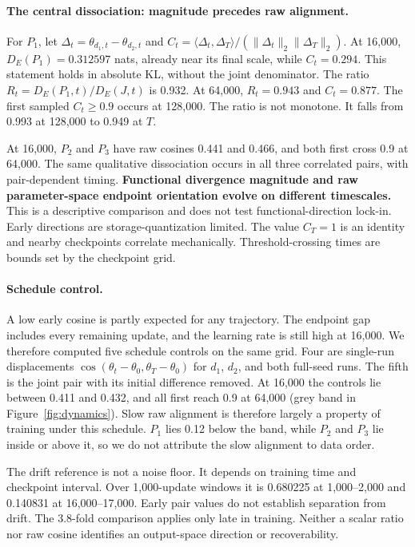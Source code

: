 \documentclass{article}
\begin{document}
\paragraph{The central dissociation: magnitude precedes raw alignment.}
For $P_1$, let $\Delta_t=\theta_{d_1,t}-\theta_{d_2,t}$ and $C_t=\langle\Delta_t,\Delta_T\rangle/(\|\Delta_t\|_2\|\Delta_T\|_2)$. At 16,000, $D_E(P_1)=0.312597$ nats, already near its final scale, while $C_t=0.294$. This statement holds in absolute KL, without the joint denominator. The ratio $R_t=D_E(P_1,t)/D_E(J,t)$ is 0.932. At 64,000, $R_t=0.943$ and $C_t=0.877$. The first sampled $C_t\geq0.9$ occurs at 128,000. The ratio is not monotone. It falls from 0.993 at 128,000 to 0.949 at $T$.

At 16,000, $P_2$ and $P_3$ have raw cosines 0.441 and 0.466, and both first cross 0.9 at 64,000. The same qualitative dissociation occurs in all three correlated pairs, with pair-dependent timing. \textbf{Functional divergence magnitude and raw parameter-space endpoint orientation evolve on different timescales.} This is a descriptive comparison and does not test functional-direction lock-in. Early directions are storage-quantization limited. The value $C_T=1$ is an identity and nearby checkpoints correlate mechanically. Threshold-crossing times are bounds set by the checkpoint grid.

\paragraph{Schedule control.}
A low early cosine is partly expected for any trajectory. The endpoint gap includes every remaining update, and the learning rate is still high at 16,000. We therefore computed five schedule controls on the same grid. Four are single-run displacements $\cos(\theta_t-\theta_0,\theta_T-\theta_0)$ for $d_1$, $d_2$, and both full-seed runs. The fifth is the joint pair with its initial difference removed. At 16,000 the controls lie between 0.411 and 0.432, and all first reach 0.9 at 64,000 (grey band in Figure~\ref{fig:dynamics}). Slow raw alignment is therefore largely a property of training under this schedule. $P_1$ lies 0.12 below the band, while $P_2$ and $P_3$ lie inside or above it, so we do not attribute the slow alignment to data order.

The drift reference is not a noise floor. It depends on training time and checkpoint interval. Over 1,000-update windows it is 0.680225 at 1,000--2,000 and 0.140831 at 16,000--17,000. Early pair values do not establish separation from drift. The 3.8-fold comparison applies only late in training. Neither a scalar ratio nor raw cosine identifies an output-space direction or recoverability.
\end{document}

